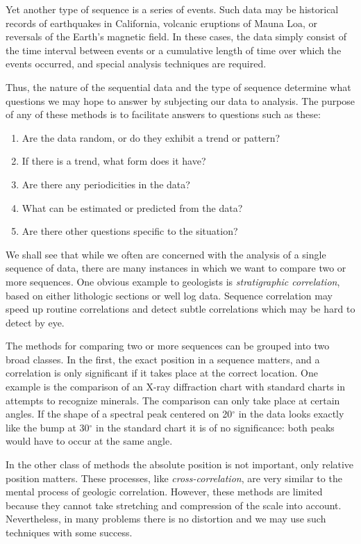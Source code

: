 	Yet another type of sequence is a series of events.  Such data may be historical records of 
earthquakes in California, volcanic eruptions of Mauna Loa, or reversals of the Earth's magnetic field.
In these cases, the data simply consist of the time interval between events or a cumulative length of time over
which the events occurred, and special analysis techniques are required.

Thus, the nature of the sequential data and the type of sequence determine what questions we 
may hope to answer by subjecting our data to analysis.  The purpose of any of these methods is to 
facilitate answers to questions such as these:
\begin{enumerate}
\item	Are the data random, or do they exhibit a trend or pattern?
	\item	If there is a trend, what form does it have?
	\item	Are there any periodicities in the data?
	\item	What can be estimated or predicted from the data?
	\item	Are there other questions specific to the situation?
\end{enumerate}

	We shall see that while we often are concerned with the analysis of a single sequence of data, there 
are many instances in which we want to compare two or more sequences.  One obvious example 
to geologists is \emph{stratigraphic correlation}, based on either lithologic sections or well log data.  Sequence 
correlation may speed up routine correlations and detect subtle correlations which may be hard to 
detect by eye.

The methods for comparing two or more sequences can be grouped into two 
broad classes.
In the first, the exact position in a sequence matters, and a correlation is only 
significant if it takes place at the correct location.  One example is the comparison of an X-ray 
diffraction chart with standard charts in attempts to recognize minerals.  The comparison can 
only take place at certain angles.  If the shape of a spectral peak centered on 20$^\circ$ in the data looks 
exactly like the bump at 30$^\circ$ in the standard chart it is of no significance: both peaks would have 
to occur at the same angle.

     In the other class of methods the absolute position is not important, only relative position 
matters.  These processes, like \emph{cross-correlation}, are very similar to the mental process of 
geologic correlation.  However, these methods are limited because they cannot take stretching 
and compression of the scale into account.  Nevertheless, in many problems there is no distortion and we may 
use such techniques with some success.


